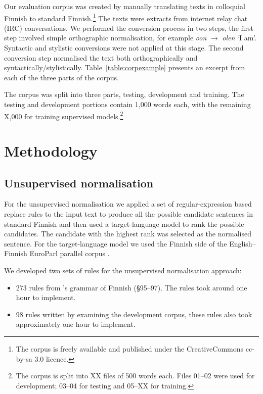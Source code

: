 \documentclass[11pt]{article}
\begin{document}
Our evaluation corpus was created by manually translating texts in colloquial Finnish
to standard Finnish.\footnote{The corpus is freely available and published under the 
CreativeCommons {\sc cc-by-sa} 3.0 licence.} The texts were extracts from internet 
relay chat (IRC) conversations. We performed the conversion process in two steps, the first
step involved simple orthographic normalisation, for 
example \emph{oon} $\rightarrow$ \emph{olen} `I am'. Syntactic and stylistic conversions 
were not applied at this stage. The second conversion step normalised the text
both orthographically and syntactically/stylistically. Table~\ref{table:corpexample} presents
an excerpt from each of the three parts of the corpus.

The corpus was split into three parts, testing, development and training. The testing
and development portions contain 1,000 words each, with the remaining X,000 for training
supervised models.\footnote{The corpus is split into XX files of 500 words each. Files 01--02 
  were used for development; 03--04 for testing and 05--XX for training.}

\section{Methodology}

\subsection{Unsupervised normalisation}

For the unsupervised normalisation we applied a set of regular-expression based 
replace rules to the input text to produce all the possible candidate sentences 
in standard Finnish and then used a target-language model to rank the possible 
candidates. The candidate with the highest rank was selected as the normalised sentence.
For the target-language model we used the Finnish side of the English--Finnish EuroParl
parallel corpus \cite{koehn2005}.

We developed two sets of rules for the unsupervised normalisation approach:

\begin{itemize}
  \item 273 rules from 's grammar of Finnish (\S95--97). The 
    rules took around one hour to implement.
  \item 98 rules written by examining the development corpus, these rules also
    took approximately one hour to implement.
\end{itemize}
\end{document}
